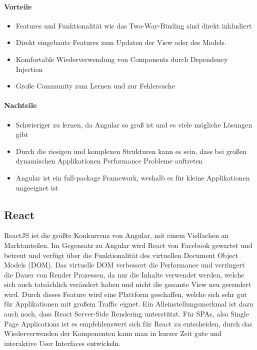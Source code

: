 \paragraph{Vorteile}
\begin{itemize}
    \item Features und Funktionalität wie das Two-Way-Binding sind direkt inkludiert
    \item Direkt eingebaute Features zum Updaten der View oder des Models.
    \item Komfortable Wiederverwendung von Components durch Dependency Injection
    \item Große Community zum Lernen und zur Fehlersuche
\end{itemize}

\paragraph{Nachteile}
\begin{itemize}
    \item Schwieriger zu lernen, da Angular so groß ist und es viele mögliche Lösungen gibt
    \item Durch die riesigen und komplexen Strukturen kann es sein, dass bei großen dynamischen Applikationen Performance Probleme auftreten
    \item Angular ist ein full-package Framework, weshalb es für kleine Applikationen ungeeignet ist
\end{itemize}

\subsection{React}
\label{subsec:react}
ReactJS ist die größte Konkurrenz von Angular, mit einem Vielfachen an Marktanteilen.
Im Gegensatz zu Angular wird React von Facebook gewartet und betreut und verfügt über die Funktionalität des virtuellen
Document Object Models (DOM).
Das virtuelle DOM verbessert die Performance und verringert die Dauer von Render Prozessen, da nur die Inhalte verwendet werden,
welche sich auch tatsächlich verändert haben und nicht die gesamte View neu gerendert wird.
Durch dieses Feature wird eine Plattform geschaffen, welche sich sehr gut für Applikationen mit großem Traffic eignet.
Ein Alleinstellungsmerkmal ist dazu auch noch, dass React Server-Side Rendering unterstützt.
Für SPAs, also Single Page Applications ist es empfehlenswert sich für React zu entscheiden, durch das Wiederverwenden der
Komponenten kann man in kurzer Zeit gute und interaktive User Interfaces entwickeln.

